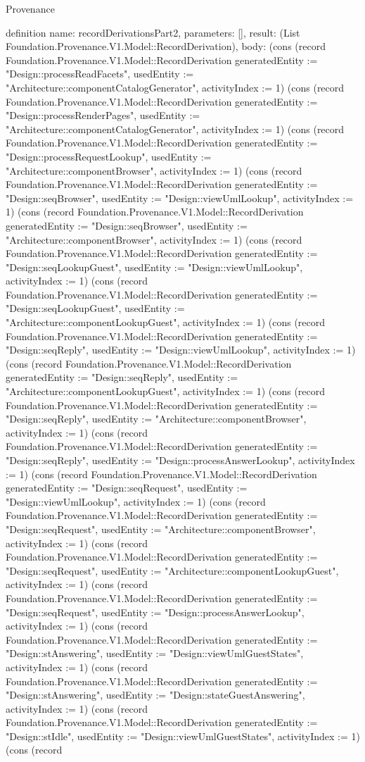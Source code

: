 \begin{lexlean}{Provenance}
\begin{semanticmodule}
definition{
  name: recordDerivationsPart2,
  parameters: [],
  result: (List Foundation.Provenance.V1.Model::RecordDerivation),
  body: (cons (record Foundation.Provenance.V1.Model::RecordDerivation {generatedEntity := "Design::processReadFacets", usedEntity := "Architecture::componentCatalogGenerator", activityIndex := 1}) (cons (record Foundation.Provenance.V1.Model::RecordDerivation {generatedEntity := "Design::processRenderPages", usedEntity := "Architecture::componentCatalogGenerator", activityIndex := 1}) (cons (record Foundation.Provenance.V1.Model::RecordDerivation {generatedEntity := "Design::processRequestLookup", usedEntity := "Architecture::componentBrowser", activityIndex := 1}) (cons (record Foundation.Provenance.V1.Model::RecordDerivation {generatedEntity := "Design::seqBrowser", usedEntity := "Design::viewUmlLookup", activityIndex := 1}) (cons (record Foundation.Provenance.V1.Model::RecordDerivation {generatedEntity := "Design::seqBrowser", usedEntity := "Architecture::componentBrowser", activityIndex := 1}) (cons (record Foundation.Provenance.V1.Model::RecordDerivation {generatedEntity := "Design::seqLookupGuest", usedEntity := "Design::viewUmlLookup", activityIndex := 1}) (cons (record Foundation.Provenance.V1.Model::RecordDerivation {generatedEntity := "Design::seqLookupGuest", usedEntity := "Architecture::componentLookupGuest", activityIndex := 1}) (cons (record Foundation.Provenance.V1.Model::RecordDerivation {generatedEntity := "Design::seqReply", usedEntity := "Design::viewUmlLookup", activityIndex := 1}) (cons (record Foundation.Provenance.V1.Model::RecordDerivation {generatedEntity := "Design::seqReply", usedEntity := "Architecture::componentLookupGuest", activityIndex := 1}) (cons (record Foundation.Provenance.V1.Model::RecordDerivation {generatedEntity := "Design::seqReply", usedEntity := "Architecture::componentBrowser", activityIndex := 1}) (cons (record Foundation.Provenance.V1.Model::RecordDerivation {generatedEntity := "Design::seqReply", usedEntity := "Design::processAnswerLookup", activityIndex := 1}) (cons (record Foundation.Provenance.V1.Model::RecordDerivation {generatedEntity := "Design::seqRequest", usedEntity := "Design::viewUmlLookup", activityIndex := 1}) (cons (record Foundation.Provenance.V1.Model::RecordDerivation {generatedEntity := "Design::seqRequest", usedEntity := "Architecture::componentBrowser", activityIndex := 1}) (cons (record Foundation.Provenance.V1.Model::RecordDerivation {generatedEntity := "Design::seqRequest", usedEntity := "Architecture::componentLookupGuest", activityIndex := 1}) (cons (record Foundation.Provenance.V1.Model::RecordDerivation {generatedEntity := "Design::seqRequest", usedEntity := "Design::processAnswerLookup", activityIndex := 1}) (cons (record Foundation.Provenance.V1.Model::RecordDerivation {generatedEntity := "Design::stAnswering", usedEntity := "Design::viewUmlGuestStates", activityIndex := 1}) (cons (record Foundation.Provenance.V1.Model::RecordDerivation {generatedEntity := "Design::stAnswering", usedEntity := "Design::stateGuestAnswering", activityIndex := 1}) (cons (record Foundation.Provenance.V1.Model::RecordDerivation {generatedEntity := "Design::stIdle", usedEntity := "Design::viewUmlGuestStates", activityIndex := 1}) (cons (record }
\end{semanticmodule}
\end{lexlean}
